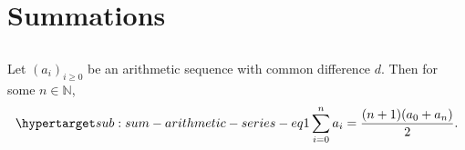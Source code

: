 \documentclass{article}
\begin{document}

\tableofcontents

\section{Summations}%

\subsection{}%

Let $(a_i)_{i \geq 0}$ be an arithmetic sequence with common difference $d$.
  Then for some $n \in \mathbb{N}$,
  \begin{equation}
    \hyperlabel{sub:sum-arithmetic-series-eq1}
    \sum_{i=0}^n a_i = \frac{(n + 1)(a_0 + a_n)}{2}.
  \end{equation}
\end{document}
